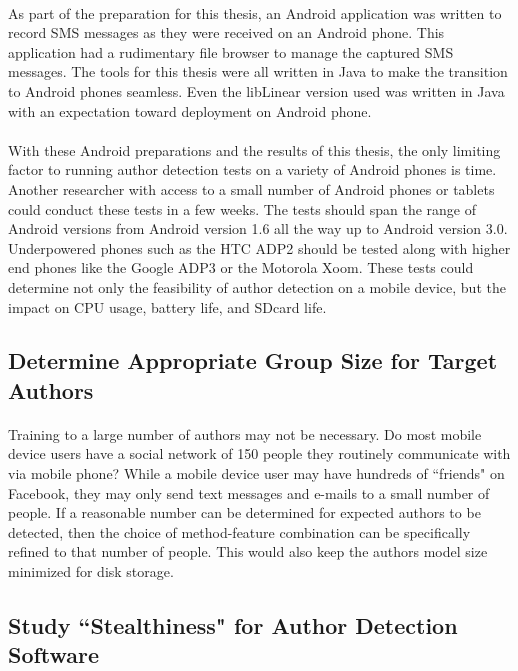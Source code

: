 		\paragraph*{} As part of the preparation for this thesis, an Android application was written to record SMS messages as they were received on an Android phone.  This application had a rudimentary file browser to manage the captured SMS messages.  The tools for this thesis were all written in Java to make the transition to Android phones seamless.  Even the libLinear version used was written in Java with an expectation toward deployment on Android phone.
		\paragraph*{} With these Android preparations and the results of this thesis, the only limiting factor to running author detection tests on a variety of Android phones is time.  Another researcher with access to a small number of Android phones or tablets could conduct these tests in a few weeks.  The tests should span the range of Android versions from Android version 1.6 all the way up to Android version 3.0.  Underpowered phones such as the HTC ADP2 should be tested along with higher end phones like the Google ADP3 or the Motorola Xoom.  These tests could determine not only the feasibility of author detection on a mobile device, but the impact on CPU usage, battery life, and SDcard life.

	\subsection{Determine Appropriate Group Size for Target Authors}
	\paragraph*{}  Training to a large number of authors may not be necessary.  Do most mobile device users have a social network of 150 people they routinely communicate with via mobile phone?  While a mobile device user may have hundreds of ``friends" on Facebook, they may only send text messages and e-mails to a small number of people.  If a reasonable number can be determined for expected authors to be detected, then the choice of method-feature combination can be specifically refined to that number of people.  This would also keep the authors model size minimized for disk storage.


	\subsection{Study ``Stealthiness" for Author Detection Software}
